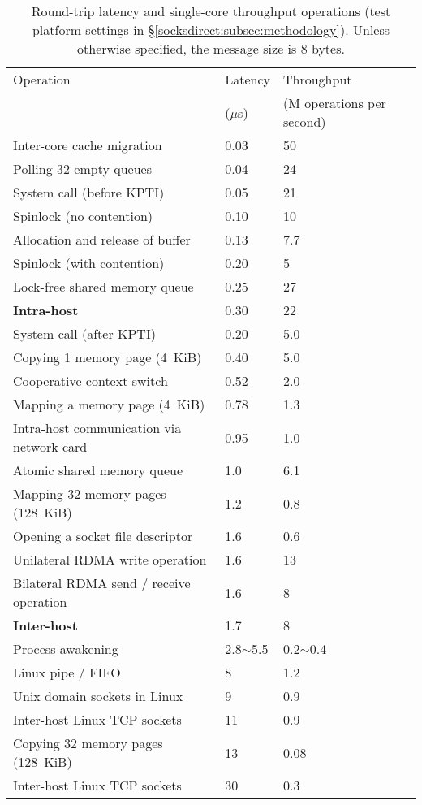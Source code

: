 \begin{table}[t]
	\centering
	\caption{Round-trip latency and single-core throughput operations (test platform settings in \S \ref {socksdirect:subsec:methodology}). Unless otherwise specified, the message size is 8 bytes.}
	\label{socksdirect:tab:operation-performance}
	\small
		\begin{tabular}{l|l|l|}
			\hline
			Operation	& Latency  & Throughput  \\
			& ($\mu$s) & (M operations per second) \\
			\hline
			\hline
			Inter-core cache migration	& 0.03 & 50 \\
			\hline
			Polling 32 empty queues & 0.04 & 24 \\
			\hline
			System call (before KPTI) & 0.05 & 21 \\
			\hline
			Spinlock (no contention) & 0.10 & 10 \\
			\hline
			Allocation and release of buffer & 0.13 & 7.7 \\
			\hline
			Spinlock (with contention) & 0.20 & 5 \\
			\hline
			Lock-free shared memory queue & 0.25 & 27 \\
			\hline
			\textbf{Intra-host \sys} & 0.30 & 22 \\
			\hline
			System call (after KPTI) & 0.20 & 5.0 \\
			\hline
			Copying 1 memory page (4~KiB) & 0.40 & 5.0 \\
			\hline
			Cooperative context switch & 0.52 & 2.0 \\
			\hline
			Mapping a memory page (4~KiB) & 0.78 & 1.3 \\
			\hline
			Intra-host communication via network card & 0.95 & 1.0 \\
			\hline
			Atomic shared memory queue & 1.0 & 6.1 \\
			\hline
			Mapping 32 memory pages (128~KiB) & 1.2 & 0.8 \\
			\hline
			Opening a socket file descriptor & 1.6 & 0.6 \\
			\hline
			Unilateral RDMA write operation & 1.6 & 13 \\
			\hline
			Bilateral RDMA send / receive operation & 1.6 & 8 \\
			\hline
			\textbf{Inter-host \sys} & 1.7 & 8 \\
			\hline
			Process awakening & 2.8$\sim$5.5 & 0.2$\sim$0.4 \\
			\hline
			Linux pipe / FIFO & 8 & 1.2 \\
			\hline
			Unix domain sockets in Linux & 9 & 0.9 \\
			\hline
			Inter-host Linux TCP sockets & 11 & 0.9 \\
			\hline
			Copying 32 memory pages (128~KiB) & 13 & 0.08 \\
			\hline
			Inter-host Linux TCP sockets & 30 & 0.3 \\
			\hline
		\end{tabular}	
\end{table}


